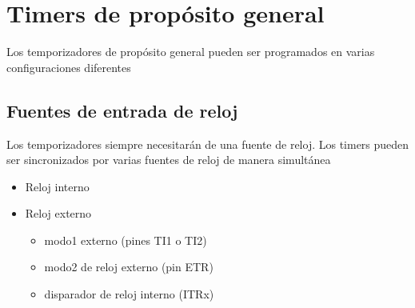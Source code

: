 \documentclass{article}
\begin{document}
\section{Timers de propósito general}
Los temporizadores de propósito general pueden ser programados en varias configuraciones diferentes

\subsection{Fuentes de entrada de reloj}
Los temporizadores siempre necesitarán de una fuente de reloj. Los timers pueden ser sincronizados por varias fuentes de reloj de manera simultánea

\begin{itemize}
	\item Reloj interno
	\item Reloj externo
	\begin{itemize}
		\item modo1 externo (pines TI1 o TI2)
		\item modo2 de reloj externo (pin ETR)
		\item disparador de reloj interno (ITRx)
	\end{itemize}
\end{itemize}
\end{document}
